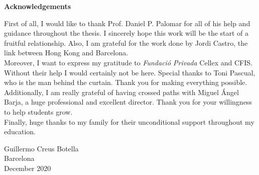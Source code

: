 \newpage
\thispagestyle{empty}

\begin{center}
	\Large
	\textbf{Acknowledgements}
\end{center}

First of all, I would like to thank Prof. Daniel P. Palomar for all of his 
help and guidance throughout the thesis. I sincerely hope this work will be 
the start of a fruitful relationship. Also, I am grateful for the work done by 
Jordi Castro, the link between Hong Kong and Barcelona.\\

Moreover, I want to express my gratitude to \textit{Fundació Privada} Cellex 
and CFIS. Without their help I would certainly not be here. Special thanks to 
Toni Pascual, who is the man behind the curtain. Thank you for making 
everything possible. Additionally, I am really grateful of having crossed paths 
with Miguel Ángel Barja, a huge professional and excellent director. Thank you 
for your willingness to help students grow.\\

Finally, huge thanks to my family for their unconditional support throughout 
my education.

\vspace{1cm}

\begin{flushright}
Guillermo Creus Botella\\
Barcelona\\
December 2020
\end{flushright}

